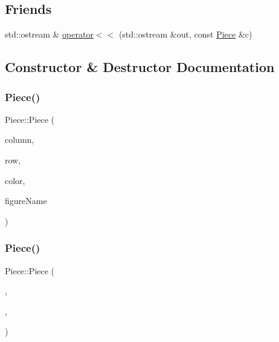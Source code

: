 \subsection*{Friends}
\begin{DoxyCompactItemize}
\item 
std\+::ostream \& \hyperlink{class_piece_a2030184caa17f039eb2a026a6dbc7d23}{operator$<$$<$} (std\+::ostream \&out, const \hyperlink{class_piece}{Piece} \&c)
\end{DoxyCompactItemize}


\subsection{Constructor \& Destructor Documentation}
\mbox{\label{class_piece_a2975fad91c5ef37d678a22253d37548f}} 
\subsubsection{\texorpdfstring{Piece()}{Piece()}\hspace{0.1cm}{\footnotesize\ttfamily [1/2]}}
{\footnotesize\ttfamily Piece\+::\+Piece (\begin{DoxyParamCaption}\item[{int}]{column,  }\item[{int}]{row,  }\item[{\hyperlink{_piece_8h_ad7595c48bb74c0dd2a7648712a2d4985}{Piece\+Color}}]{color,  }\item[{std\+::string}]{figure\+Name }\end{DoxyParamCaption})}

\mbox{\label{class_piece_a99ebd588613d69a9aa7896240f810308}} 
\subsubsection{\texorpdfstring{Piece()}{Piece()}\hspace{0.1cm}{\footnotesize\ttfamily [2/2]}}
{\footnotesize\ttfamily Piece\+::\+Piece (\begin{DoxyParamCaption}\item[{\hyperlink{struct_position}{Position}}]{,  }\item[{\hyperlink{_piece_8h_ad7595c48bb74c0dd2a7648712a2d4985}{Piece\+Color}}]{,  }\item[{std\+::string}]{ }\end{DoxyParamCaption})\hspace{0.3cm}{\ttfamily [inline]}}



